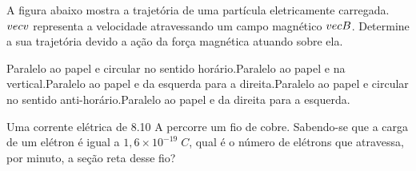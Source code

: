 \documentclass[12pt, addpoints]{exam}
\begin{document}
        \begin{questions}
\begin{multicols*}{2}
\question[20] A ﬁgura abaixo mostra a trajetória de uma partícula eletricamente carregada. $\\vec{{v}}$ representa a velocidade atravessando um campo magnético $\\vec{{B}}$. Determine a sua trajetória devido a ação da força magnética atuando sobre ela.
        
        \begin{center}
            \begin{minipage}[c]{0.5\linewidth}
            \end{minipage}
        \end{center}

        

\begin{choices}
\choice Paralelo ao papel e circular no sentido horário.\choice Paralelo ao papel e na vertical.\choice Paralelo ao papel e da esquerda para a direita.\choice Paralelo ao papel e circular no sentido anti-horário.\choice Paralelo ao papel e da direita para a esquerda.\end{choices}
\question[20] Uma corrente elétrica de    8.10 A percorre um ﬁo de cobre. Sabendo-se que a carga de um elétron é igual a $1,6\times 10^{-19}\;C$, qual é o número de elétrons que atravessa, por minuto, a seção reta desse ﬁo?


\end{multicols*}
\end{questions}
\end{document}
